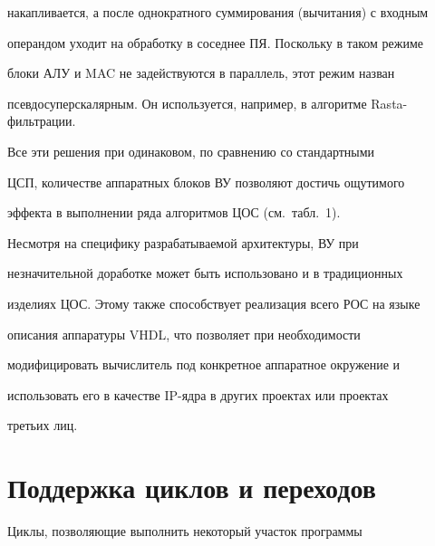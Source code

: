 накапливается, а после однократного суммирования (вычитания) с входным 


операндом уходит на обработку в соседнее ПЯ. Поскольку в таком режиме 


блоки АЛУ и MAC не задействуются в параллель, этот режим назван 


псевдосуперскалярным. Он используется, например, в алгоритме Rasta-фильт\-ра\-ции.


      


      Все эти решения при одинаковом, по сравнению со стандартными 


ЦСП, количестве аппаратных блоков ВУ позволяют достичь ощутимого 


эффекта в выполнении ряда алгоритмов ЦОС (см.\ табл.~1). 


       





      


      Несмотря на специфику разрабатываемой архитектуры, ВУ при 


незначительной доработке может быть использовано и в традиционных 


изделиях ЦОС. Этому также способствует реализация всего РОС на языке 


описания аппаратуры VHDL, что позволяет при необходимости 


модифицировать вычислитель под конкретное аппаратное окружение и 


использовать его в качестве IP-яд\-ра в других проектах или проектах 


третьих лиц.










\section{Поддержка циклов и переходов}







      


      Циклы, позволяющие выполнить некоторый участок прог\-рам\-мы 


